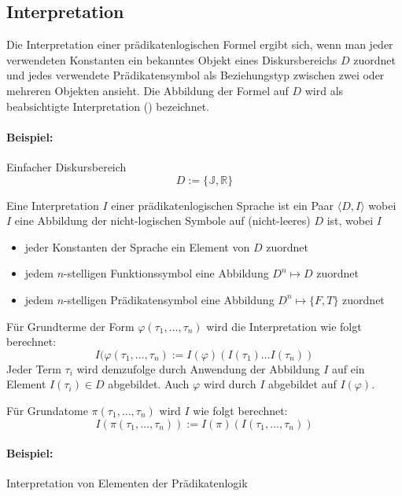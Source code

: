 \documentclass[a4paper]{scrartcl}
\begin{document}
\subsection{Interpretation}

Die Interpretation einer prädikatenlogischen Formel ergibt sich, wenn man jeder verwendeten Konstanten 
ein bekanntes Objekt eines Diskursbereichs $D$ zuordnet und jedes verwendete Prädikatensymbol als Beziehungstyp zwischen 
zwei oder mehreren Objekten ansieht. Die Abbildung der Formel auf $D$ wird als beabsichtigte Interpretation 
() bezeichnet.

\def\J{\mathbb{J}}
\def\R{\mathbb{R}}

\paragraph{Beispiel:} Einfacher Diskursbereich
$$D := \{\J,\R\}$$

Eine Interpretation $I$ einer prädikatenlogischen Sprache ist ein Paar $\langle D,I\rangle$ wobei $I$ eine Abbildung der
nicht-logischen Symbole auf (nicht-leeres) $D$ ist, wobei $I$

\begin{itemize}
\item jeder Konstanten der Sprache ein Element von $D$ zuordnet
\item jedem $n$-stelligen Funktionssymbol eine Abbildung $D^n \mapsto D$ zuordnet
\item jedem $n$-stelligen Prädikatensymbol eine Abbildung $D^n \mapsto \{F,T\}$ zuordnet
\end{itemize}

Für Grundterme der Form $\varphi (\tau_1, \ldots, \tau_n)$ wird die Interpretation wie folgt berechnet:
$$I (\varphi (\tau_1, \ldots, \tau_n) := I(\varphi)(I(\tau_1) \ldots I(\tau_n))$$
Jeder Term $\tau_i$ wird demzufolge durch Anwendung der Abbildung $I$ auf ein Element $I(\tau_i) \in D$ abgebildet.
Auch $\varphi$ wird durch $I$ abgebildet auf $I(\varphi)$.

Für Grundatome $\pi(\tau_1, \ldots, \tau_n)$ wird $I$ wie folgt berechnet:
$$I(\pi(\tau_1, \ldots, \tau_n)) := I(\pi)(I(\tau_1, \ldots, \tau_n))$$

\paragraph{Beispiel:} Interpretation von Elementen der Prädikatenlogik
\end{document}
